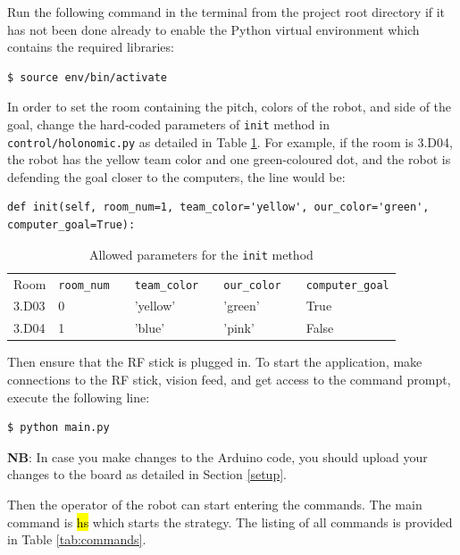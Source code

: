 \documentclass[a4paper,12pt]{article}
\newcommand{\hg}[1]{\hl{\ttfamily #1}}
\begin{document}
Run the following command in the terminal from the project root directory if it has not been done already to enable the Python virtual environment which contains the required libraries:
\begin{lstlisting}
$ source env/bin/activate
\end{lstlisting}

In order to set the room containing the pitch, colors of the robot, and side of the goal, change the hard-coded parameters of \texttt{init} method in \texttt{control/holonomic.py} as detailed in Table \ref{tab:params}.
For example, if the room is 3.D04, the robot has the yellow team color and one green-coloured dot, and the robot is defending the goal closer to the computers, the line would be:
\begin{lstlisting}
def init(self, room_num=1, team_color='yellow', our_color='green', computer_goal=True):
\end{lstlisting}

\begin{table}[h!]
\centering
\begin{tabular}{ | l | l | l | l | l | l | l | l | }
    \cline{1-2} \cline{4-4} \cline{6-6} \cline{8-8}
    Room & \texttt{room\_num} & & \texttt{team\_color} & & \texttt{our\_color} & & \texttt{computer\_goal} \\ 
    \cline{1-2} \cline{4-4} \cline{6-6} \cline{8-8}
    3.D03 & 0 & & 'yellow' & & 'green' & & True \\ 
    \cline{1-2} \cline{4-4} \cline{6-6} \cline{8-8}
    3.D04 & 1 & & 'blue' & & 'pink' & & False \\ 
    \cline{1-2} \cline{4-4} \cline{6-6} \cline{8-8}
\end{tabular}
\caption{Allowed parameters for the \texttt{init} method}
\label{tab:params}
\end{table}

Then ensure that the RF stick is plugged in. To start the application, make connections to the RF stick, vision feed, and get access to the command prompt, execute the following line:
\begin{lstlisting}
$ python main.py
\end{lstlisting}

\textbf{NB}: In case you make changes to the Arduino code, you should upload your changes to the board as detailed in Section \ref{setup}.

Then the operator of the robot can start entering the commands. The main command is \hg{hs} which starts the strategy. The listing of all commands is provided in Table \ref{tab:commands}.
\end{document}

